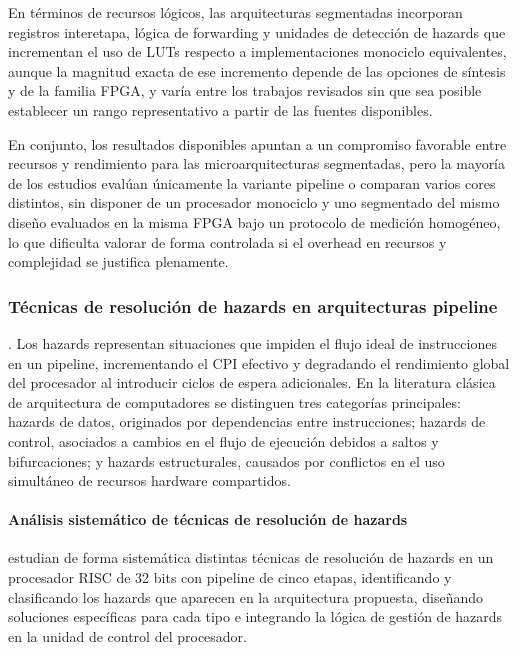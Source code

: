 En términos de recursos lógicos, las arquitecturas segmentadas incorporan
registros interetapa, lógica de forwarding y unidades de detección de hazards
que incrementan el uso de LUTs respecto a implementaciones monociclo
equivalentes, aunque la magnitud exacta de ese incremento depende de las
opciones de síntesis y de la familia FPGA, y varía entre los trabajos revisados
sin que sea posible establecer un rango representativo a partir de las fuentes
disponibles.

En conjunto, los resultados disponibles apuntan a un compromiso favorable entre
recursos y rendimiento para las microarquitecturas segmentadas, pero la mayoría
de los estudios evalúan únicamente la variante pipeline o comparan varios cores
distintos, sin disponer de un procesador monociclo y uno segmentado del mismo
diseño evaluados en la misma FPGA bajo un protocolo de medición homogéneo, lo
que dificulta valorar de forma controlada si el overhead en recursos y
complejidad se justifica plenamente.


\subsubsection{Técnicas de resolución de hazards en arquitecturas pipeline}
.
Los hazards representan situaciones que impiden el flujo ideal de instrucciones
en un pipeline, incrementando el CPI efectivo y degradando el rendimiento global
del procesador al introducir ciclos de espera adicionales. En la literatura
clásica de arquitectura de computadores se distinguen tres categorías
principales: hazards de datos, originados por dependencias entre instrucciones;
hazards de control, asociados a cambios en el flujo de ejecución debidos a
saltos y bifurcaciones; y hazards estructurales, causados por conflictos en el
uso simultáneo de recursos hardware compartidos.\parencite{Patterson2017Computer}


\paragraph{Análisis sistemático de técnicas de resolución de hazards}

\textcite{Najjar2018Pipeline} estudian de forma sistemática distintas técnicas
de resolución de hazards en un procesador RISC de 32 bits con pipeline de cinco
etapas, identificando y clasificando los hazards que aparecen en la arquitectura
propuesta, diseñando soluciones específicas para cada tipo e integrando la
lógica de gestión de hazards en la unidad de control del procesador.

